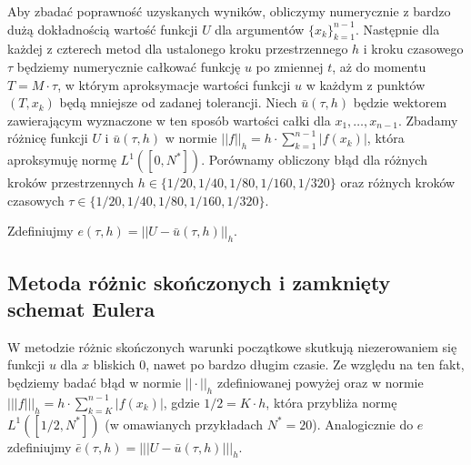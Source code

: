 \documentclass{article}
\begin{document}
Aby zbadać poprawność uzyskanych wyników, obliczymy numerycznie z bardzo dużą dokładnością wartość funkcji $U$ dla argumentów $\{x_k\}_{k=1}^{n-1}$. Następnie dla każdej z czterech metod dla ustalonego kroku przestrzennego $h$ i kroku czasowego $\tau$ będziemy numerycznie całkować funkcję $u$ po zmiennej $t$, aż do momentu $T=M\cdot\tau$, w którym aproksymacje wartości funkcji $u$ w każdym z punktów $(T, x_k)$ będą mniejsze od zadanej tolerancji. Niech $\bar{u}(\tau,h)$ będzie wektorem zawierającym wyznaczone w ten sposób wartości całki dla $x_{1},\dots,x_{n-1}$. Zbadamy różnicę funkcji $U$ i $\bar{u}(\tau,h)$ w normie $||f||_{h} = h\cdot \sum_{k=1}^{n-1}|f(x_k)|$, która aproksymuję normę $L^{1}([0,N^{*}])$. Porównamy obliczony błąd dla różnych kroków przestrzennych $h\in\{1/20, 1/40, 1/80,1/160, 1/320\}$ oraz różnych kroków czasowych $\tau\in\{1/20, 1/40, 1/80,1/160, 1/320\}$.

Zdefiniujmy $e(\tau,h)=||U-\bar{u}(\tau,h)||_{h}$.
\subsection{Metoda różnic skończonych i zamknięty schemat Eulera}
W metodzie różnic skończonych warunki początkowe skutkują niezerowaniem się funkcji $u$ dla $x$ bliskich 0, nawet po bardzo długim czasie. Ze względu na ten fakt, będziemy badać błąd w normie $||\cdot||_{h}$ zdefiniowanej powyżej oraz w normie $|||f|||_{h} = h\cdot \sum_{k=K}^{n-1}|f(x_k)|$, gdzie $1/2 = K\cdot h$, która przybliża normę $L^{1}([1/2,N^{*}])$ (w omawianych przykładach $N^{*}=20$). Analogicznie do $e$ zdefiniujmy $\bar{e}(\tau,h)=|||U-\bar{u}(\tau,h)|||_{h}$.
\end{document}
